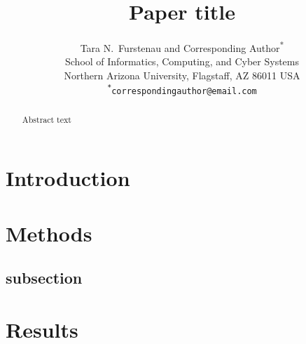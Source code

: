 \documentclass[12pt,titlepage]{article}
\begin{document}
\linenumbers

\title{Paper title}

\author{Tara N.\ Furstenau and Corresponding Author\textsuperscript{*}\\
School of Informatics, Computing, and Cyber Systems\\ Northern Arizona University, Flagstaff, AZ 86011 USA\\
\texttt{\textsuperscript{*}correspondingauthor@email.com}}


\date{}

\maketitle %



\newpage
\begin{abstract}\noindent%
Abstract text
\end{abstract}



\newpage
\section{Introduction}




\section{Methods}
\subsection{subsection}



\section{Results}
\end{document}
